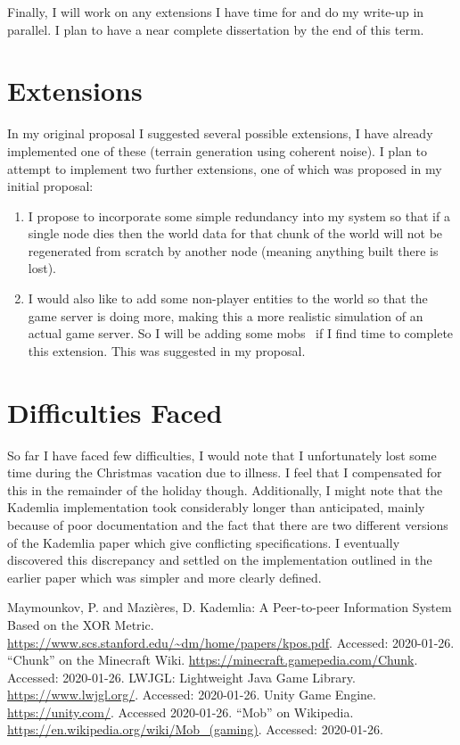 \documentclass[11pt,a4paper]{article}
\begin{document}
	Finally, I will work on any extensions I have time for and do my write-up in parallel. I plan to have a near complete dissertation by the end of this term.
	\section{Extensions}
	In my original proposal I suggested several possible extensions, I have already implemented one of these (terrain generation using coherent noise). I plan to attempt to implement two further extensions, one of which was proposed in my initial proposal:
	\begin{enumerate}
		\item I propose to incorporate some simple redundancy into my system so that if a single node dies then the world data for that chunk of the world will not be regenerated from scratch by another node (meaning anything built there is lost).
		\item I would also like to add some non-player entities to the world so that the game server is doing more, making this a more realistic simulation of an actual game server. So I will be adding some mobs~\cite{mob} if I find time to complete this extension. This was suggested in my proposal.
	\end{enumerate}
	\section{Difficulties Faced}
	So far I have faced few difficulties, I would note that I unfortunately lost some time during the Christmas vacation due to illness. I feel that I compensated for this in the remainder of the holiday though. Additionally, I might note that the Kademlia implementation took considerably longer than anticipated, mainly because of poor documentation and the fact that there are two different versions of the Kademlia paper which give conflicting specifications. I eventually discovered this discrepancy and settled on the implementation outlined in the earlier paper which was simpler and more clearly defined.
	\begin{thebibliography}{9}
		 Maymounkov, P. and Mazières, D. Kademlia: A Peer-to-peer Information System Based on the XOR Metric. \url{https://www.scs.stanford.edu/~dm/home/papers/kpos.pdf}. Accessed: 2020-01-26.
		 ``Chunk'' on the Minecraft Wiki. \url{https://minecraft.gamepedia.com/Chunk}. Accessed: 2020-01-26.
		 LWJGL: Lightweight Java Game Library. \url{https://www.lwjgl.org/}. Accessed: 2020-01-26.
		 Unity Game Engine. \url{https://unity.com/}. Accessed 2020-01-26.
		 ``Mob'' on Wikipedia. \url{https://en.wikipedia.org/wiki/Mob_(gaming)}. Accessed: 2020-01-26.
	\end{thebibliography}
\end{document}
